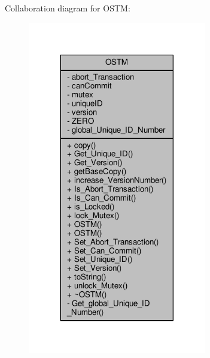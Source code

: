 Collaboration diagram for O\+S\+TM\+:
\nopagebreak
\begin{figure}[H]
\begin{center}
\leavevmode
\includegraphics[width=221pt]{class_o_s_t_m__coll__graph}
\end{center}
\end{figure}
